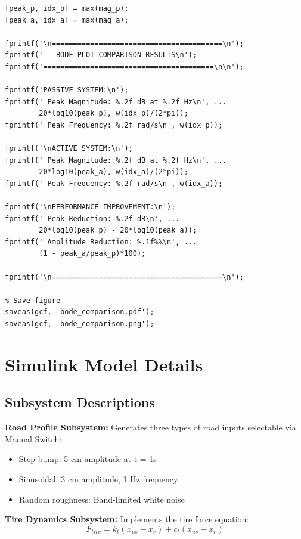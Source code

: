 \documentclass[12pt,a4paper]{article}
\begin{document}
\begin{lstlisting}[caption={Bode plot comparison and performance metrics calculation}]
%% Calculate and Display Performance Metrics
[peak_p, idx_p] = max(mag_p);
[peak_a, idx_a] = max(mag_a);

fprintf('\n========================================\n');
fprintf('   BODE PLOT COMPARISON RESULTS\n');
fprintf('========================================\n\n');

fprintf('PASSIVE SYSTEM:\n');
fprintf(' Peak Magnitude: %.2f dB at %.2f Hz\n', ...
        20*log10(peak_p), w(idx_p)/(2*pi));
fprintf(' Peak Frequency: %.2f rad/s\n', w(idx_p));

fprintf('\nACTIVE SYSTEM:\n');
fprintf(' Peak Magnitude: %.2f dB at %.2f Hz\n', ...
        20*log10(peak_a), w(idx_a)/(2*pi));
fprintf(' Peak Frequency: %.2f rad/s\n', w(idx_a));

fprintf('\nPERFORMANCE IMPROVEMENT:\n');
fprintf(' Peak Reduction: %.2f dB\n', ...
        20*log10(peak_p) - 20*log10(peak_a));
fprintf(' Amplitude Reduction: %.1f%%\n', ...
        (1 - peak_a/peak_p)*100);

fprintf('\n========================================\n');

% Save figure
saveas(gcf, 'bode_comparison.pdf');
saveas(gcf, 'bode_comparison.png');
\end{lstlisting}

\section{Simulink Model Details}

\subsection{Subsystem Descriptions}

\textbf{Road Profile Subsystem:}
Generates three types of road inputs selectable via Manual Switch:
\begin{itemize}
    \item Step bump: 5 cm amplitude at t = 1s
    \item Sinusoidal: 3 cm amplitude, 1 Hz frequency
    \item Random roughness: Band-limited white noise
\end{itemize}

\textbf{Tire Dynamics Subsystem:}
Implements the tire force equation:
\begin{equation*}
F_{tire} = k_t(x_{us} - x_r) + c_t(\dot{x}_{us} - \dot{x}_r)
\end{equation*}
\end{document}
